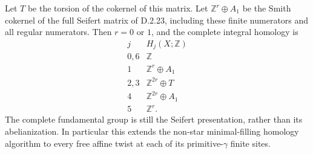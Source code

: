 Let $T$ be the torsion of the cokernel of this matrix. Let
$\mathbb Z^r\oplus A_1$ be the Smith cokernel of the full
Seifert matrix of D.2.23, including these finite numerators
and all regular numerators. Then $r=0$ or $1$, and the complete
integral homology is
\[
\begin{array}{c|c}
 j&H_j(X;\mathbb Z)\\\hline
0,6&\mathbb Z\\
1&\mathbb Z^r\oplus A_1\\
2,3&\mathbb Z^{2r}\oplus T\\
4&\mathbb Z^{2r}\oplus A_1\\
5&\mathbb Z^r.
\end{array}                                                  \tag{D.UF5}
\]
The complete fundamental group is still the Seifert
presentation, rather than its abelianization. In particular
this extends the non-star minimal-filling homology algorithm
to every free affine twist at each of its primitive-$\gamma$
finite sites.

